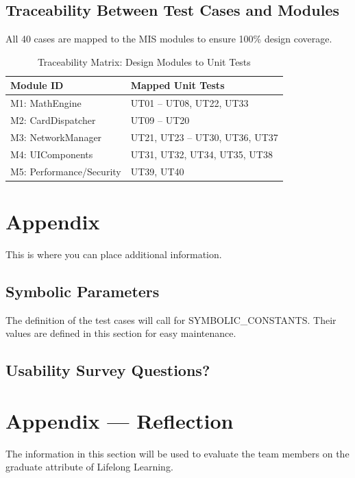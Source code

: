 \documentclass[12pt, titlepage]{article}
\begin{document}
\subsection{Traceability Between Test Cases and Modules}
All 40 cases are mapped to the MIS modules to ensure 100\% design coverage.

\begin{table}[h]
    \centering
    \begin{tabular}{ll}
        \toprule
        \textbf{Module ID} & \textbf{Mapped Unit Tests} \\
        \midrule
        M1: MathEngine & UT01 -- UT08, UT22, UT33 \\
        M2: CardDispatcher & UT09 -- UT20 \\
        M3: NetworkManager & UT21, UT23 -- UT30, UT36, UT37 \\
        M4: UIComponents & UT31, UT32, UT34, UT35, UT38 \\
        M5: Performance/Security & UT39, UT40 \\
        \bottomrule
    \end{tabular}
    \caption{Traceability Matrix: Design Modules to Unit Tests}
\end{table}


\newpage

\section{Appendix}

This is where you can place additional information.

\subsection{Symbolic Parameters}

The definition of the test cases will call for SYMBOLIC\_CONSTANTS.
Their values are defined in this section for easy maintenance.

\subsection{Usability Survey Questions?}

\newpage{}
\section*{Appendix --- Reflection}


The information in this section will be used to evaluate the team members on the
graduate attribute of Lifelong Learning.
\end{document}
